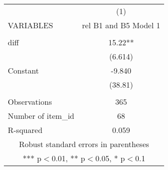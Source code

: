 \documentclass[]{article}
\begin{document}
\begin{tabular}{lc} \hline
 & (1) \\
VARIABLES & rel B1 and B5 Model 1 \\ \hline
 &  \\
diff & 15.22** \\
 & (6.614) \\
Constant & -9.840 \\
 & (38.81) \\
 &  \\
Observations & 365 \\
Number of item\_id & 68 \\
 R-squared & 0.059 \\ \hline
\multicolumn{2}{c}{ Robust standard errors in parentheses} \\
\multicolumn{2}{c}{ *** p$<$0.01, ** p$<$0.05, * p$<$0.1} \\
\end{tabular}
\end{document}
